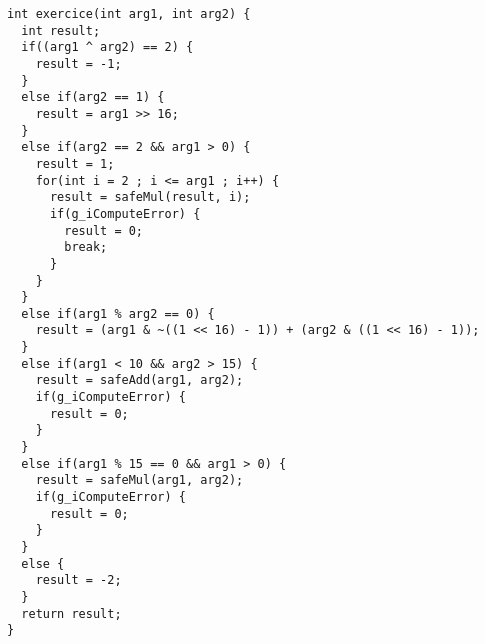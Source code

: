 \documentclass[10pt]{article}
\begin{document}

\begin{verbatim}
int exercice(int arg1, int arg2) {
  int result;
  if((arg1 ^ arg2) == 2) {
    result = -1;
  }
  else if(arg2 == 1) {
    result = arg1 >> 16;
  }
  else if(arg2 == 2 && arg1 > 0) {
    result = 1;
    for(int i = 2 ; i <= arg1 ; i++) {
      result = safeMul(result, i);
      if(g_iComputeError) {
        result = 0;
        break;
      }      
    }
  }
  else if(arg1 % arg2 == 0) {
    result = (arg1 & ~((1 << 16) - 1)) + (arg2 & ((1 << 16) - 1));
  }
  else if(arg1 < 10 && arg2 > 15) {
    result = safeAdd(arg1, arg2);
    if(g_iComputeError) {
      result = 0;
    }
  }
  else if(arg1 % 15 == 0 && arg1 > 0) {
    result = safeMul(arg1, arg2);
    if(g_iComputeError) {
      result = 0;
    }
  }
  else {
    result = -2;
  }
  return result;
}
\end{verbatim}


\begin{acronym}
\end{acronym}
\end{document}
